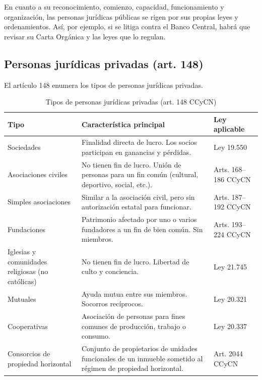 \documentclass[12pt,oneside]{book}
\begin{document}
En cuanto a su reconocimiento, comienzo, capacidad, funcionamiento y organización, las personas jurídicas públicas se rigen por sus propias leyes y ordenamientos. Así, por ejemplo, si se litiga contra el Banco Central, habrá que revisar su Carta Orgánica y las leyes que lo regulan.

\subsection{Personas jurídicas privadas (art. 148)}

El artículo 148 enumera los tipos de personas jurídicas privadas.

\begin{table}[H]
\centering
\caption{Tipos de personas jurídicas privadas (art. 148 CCyCN)}
\begin{tabularx}{\textwidth}{
    >{\raggedright\arraybackslash}p{}
    >{\raggedright\arraybackslash}X
    >{\raggedright\arraybackslash}p{}
}
\toprule
\textbf{Tipo} & \textbf{Característica principal} & \textbf{Ley aplicable} \\
\midrule
Sociedades & Finalidad directa de lucro. Los socios participan en ganancias y pérdidas. & Ley 19.550 \\
Asociaciones civiles & No tienen fin de lucro. Unión de personas para un fin común (cultural, deportivo, social, etc.). & Arts. 168--186 CCyCN \\
Simples asociaciones & Similar a la asociación civil, pero sin autorización estatal para funcionar. & Arts. 187--192 CCyCN \\
Fundaciones & Patrimonio afectado por uno o varios fundadores a un fin de bien común. Sin miembros. & Arts. 193--224 CCyCN \\
Iglesias y comunidades religiosas (no católicas) & No tienen fin de lucro. Libertad de culto y conciencia. & Ley 21.745 \\
Mutuales & Ayuda mutua entre sus miembros. Socorros recíprocos. & Ley 20.321 \\
Cooperativas & Asociación de personas para fines comunes de producción, trabajo o consumo. & Ley 20.337 \\
Consorcios de propiedad horizontal & Conjunto de propietarios de unidades funcionales de un inmueble sometido al régimen de propiedad horizontal. & Art. 2044 CCyCN \\
\bottomrule
\end{tabularx}
\end{table}
\end{document}
